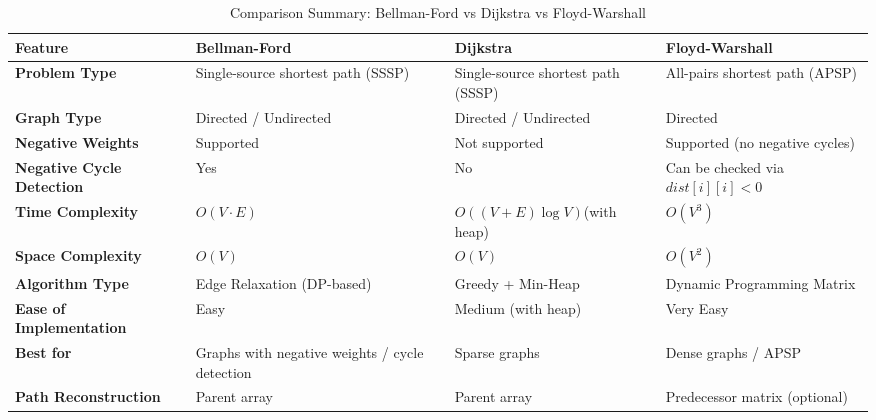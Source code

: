 \documentclass[14pt,a4paper]{extarticle}
\begin{document}
\newpage


\renewcommand{\arraystretch}{1.4}
\begin{table}[ht]
\centering
\begin{tabularx}{\textwidth}{|>{\raggedright\arraybackslash}p{4.2cm}|
                            >{\raggedright\arraybackslash}X|
                            >{\raggedright\arraybackslash}X|
                            >{\raggedright\arraybackslash}X|}
\hline
\textbf{Feature} & \textbf{Bellman-Ford} & \textbf{Dijkstra} & \textbf{Floyd-Warshall} \\
\hline
\textbf{Problem Type} & Single-source shortest path (SSSP) & Single-source shortest path (SSSP) & All-pairs shortest path (APSP) \\
\hline
\textbf{Graph Type} & Directed / Undirected & Directed / Undirected & Directed \\
\hline
\textbf{Negative Weights} & Supported & Not supported & Supported (no negative cycles) \\
\hline
\textbf{Negative Cycle Detection} & Yes & No & Can be checked via \(dist[i][i] < 0\) \\
\hline
\textbf{Time Complexity} & \(O(V \cdot E)\) & \(O((V + E)\log V)\)\newline (with heap) & \(O(V^3)\) \\
\hline
\textbf{Space Complexity} & \(O(V)\) & \(O(V)\) & \(O(V^2)\) \\
\hline
\textbf{Algorithm Type} & Edge Relaxation (DP-based) & Greedy + Min-Heap & Dynamic Programming Matrix \\
\hline
\textbf{Ease of Implementation} & Easy & Medium (with heap) & Very Easy \\
\hline
\textbf{Best for} & Graphs with negative weights / cycle detection & Sparse graphs & Dense graphs / APSP \\
\hline
\textbf{Path Reconstruction} & Parent array & Parent array & Predecessor matrix (optional) \\
\hline
\end{tabularx}
\caption{Comparison Summary: Bellman-Ford vs Dijkstra vs Floyd-Warshall}
\end{table}
\end{document}
